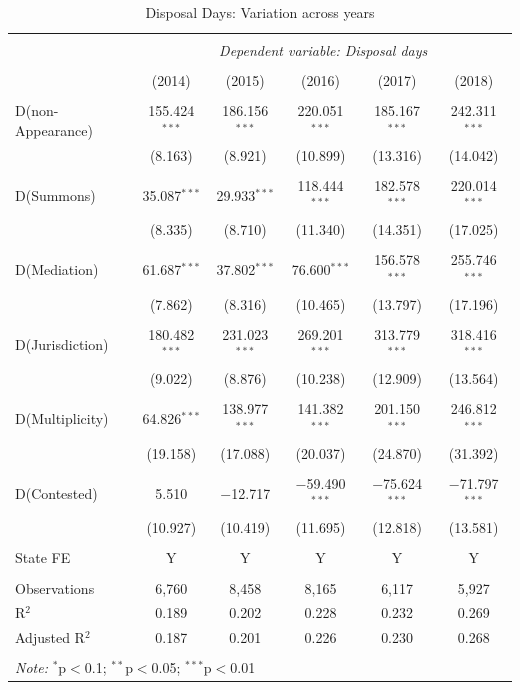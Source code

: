 \documentclass[12pt,a4paper]{article}
\begin{document}
{\footnotesize \begin{longtable}{lcc|ccc}
\caption{Disposal Days: Variation across years}\label{tab:yearFE}
\\[-1.8ex]
\hline \\[-1.8ex]
& \multicolumn{5}{c}{\textit{Dependent variable: Disposal days}} \\
\cline{2-6}
\\[-1.8ex] & (2014) & (2015) & (2016) & (2017) & (2018)\\
\hline \\[-1.8ex]

D(non-Appearance) & 155.424$^{***}$ & 186.156$^{***}$ & 220.051$^{***}$ & 185.167$^{***}$ & 242.311$^{***}$ \\
& (8.163) & (8.921) & (10.899) & (13.316) & (14.042) \\
& & & & & \\
D(Summons) & 35.087$^{***}$ & 29.933$^{***}$ & 118.444$^{***}$ & 182.578$^{***}$ & 220.014$^{***}$ \\
& (8.335) & (8.710) & (11.340) & (14.351) & (17.025) \\
& & & & & \\
D(Mediation) & 61.687$^{***}$ & 37.802$^{***}$ & 76.600$^{***}$ & 156.578$^{***}$ & 255.746$^{***}$ \\
& (7.862) & (8.316) & (10.465) & (13.797) & (17.196) \\
& & & & & \\
D(Jurisdiction) & 180.482$^{***}$ & 231.023$^{***}$ & 269.201$^{***}$ & 313.779$^{***}$ & 318.416$^{***}$ \\
& (9.022) & (8.876) & (10.238) & (12.909) & (13.564) \\
& & & & & \\
D(Multiplicity) & 64.826$^{***}$ & 138.977$^{***}$ & 141.382$^{***}$ & 201.150$^{***}$ & 246.812$^{***}$ \\
& (19.158) & (17.088) & (20.037) & (24.870) & (31.392) \\
& & & & & \\
D(Contested) & 5.510 & $-$12.717 & $-$59.490$^{***}$ & $-$75.624$^{***}$ & $-$71.797$^{***}$ \\
& (10.927) & (10.419) & (11.695) & (12.818) & (13.581) \\

\hline \\[-1.8ex]
State FE & Y & Y & Y & Y & Y \\
\hline \\[-1.8ex]

Observations & 6,760 & 8,458 & 8,165 & 6,117 & 5,927 \\
R$^{2}$ & 0.189 & 0.202 & 0.228 & 0.232 & 0.269 \\
Adjusted R$^{2}$ & 0.187 & 0.201 & 0.226 & 0.230 & 0.268 \\

\hline \\[-1.8ex]
\multicolumn{6}{l}{\textit{Note:} $^{*}$p$<$0.1; $^{**}$p$<$0.05; $^{***}$p$<$0.01} \\
\end{longtable}
}
\end{document}
